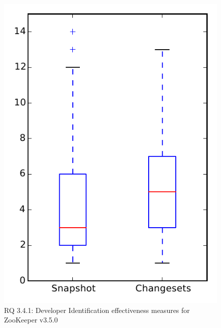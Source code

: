 
\begin{figure}
\centering
\includegraphics[height=0.4\textheight]{figures/dit/rq1_zookeeper}
\caption{RQ 3.4.1: Developer Identification effectiveness measures for ZooKeeper v3.5.0}
\label{fig:dit:rq1:zookeeper}
\end{figure}
